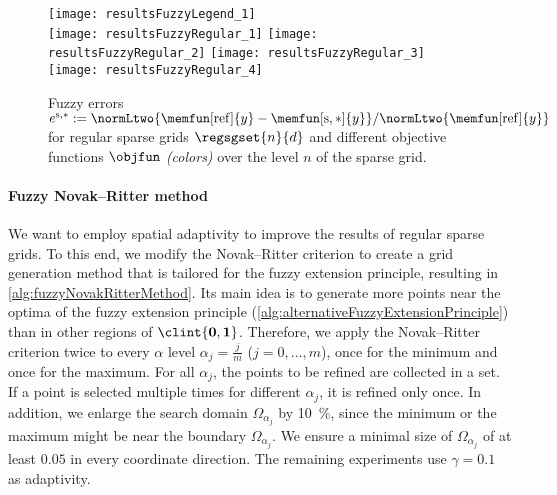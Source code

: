 \begin{figure}
  \texttt{[image: resultsFuzzyLegend\_1]}\\[2mm]%
  \texttt{[image: resultsFuzzyRegular\_1]}%
  \hfill%
  \texttt{[image: resultsFuzzyRegular\_2]}%
  \hfill%
  \texttt{[image: resultsFuzzyRegular\_3]}%
  \hfill%
  \texttt{[image: resultsFuzzyRegular\_4]}%
  \caption[Fuzzy errors for regular sparse grids]{%
    Fuzzy errors
    $e^{\sparse,\ast}
    := \normLtwo{\memfun[\reference]{y} - \memfun[\sparse,\ast]{y}}/
    \normLtwo{\memfun[\reference]{y}}$
    for regular sparse grids $\regsgset{n}{d}$
    and different objective functions $\objfun$ \emph{(colors)}
    over the level $n$ of the sparse grid.%
  }%
  \label{fig:resultsFuzzyRegular}%
\end{figure}

\paragraph{Fuzzy Novak--Ritter method}

We want to employ spatial adaptivity to improve the results
of regular sparse grids.
To this end, we modify the Novak--Ritter criterion
to create a grid generation method that is tailored for the
fuzzy extension principle, resulting in \cref{alg:fuzzyNovakRitterMethod}.
Its main idea is to generate more points near the optima
of the fuzzy extension principle
(\cref{alg:alternativeFuzzyExtensionPrinciple}) than in other regions
of $\clint{\*0, \*1}$.
Therefore, we apply the Novak--Ritter criterion twice to
every $\alpha$ level $\alpha_j = \tfrac{j}{m}$ ($j = 0, \dotsc, m$),
once for the minimum and once for the maximum.
For all $\alpha_j$, the points to be refined are collected in a set.
If a point is selected multiple times for different $\alpha_j$,
it is refined only once.
In addition, we enlarge the search domain $\Omega_{\alpha_j}$
by \SI{10}{\percent}, since the minimum or the maximum might be
near the boundary $\Omega_{\alpha_j}$.
We ensure a minimal size of $\Omega_{\alpha_j}$ of at least $0.05$
in every coordinate direction.
The remaining experiments use $\gamma = 0.1$ as adaptivity.

